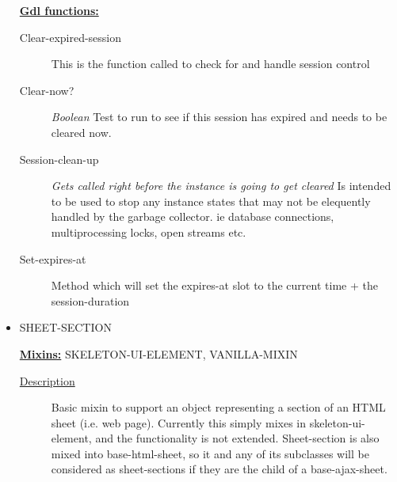 \documentclass [11pt]{book}
\begin{document}
\begin{itemize}
\textbf{
\underline{Gdl functions:}}

\begin{description}

\item [Clear-expired-session]
This is the function called to check for and handle session control


\item [Clear-now?]
\emph{Boolean} Test to run to see if this session has expired and needs to be cleared now.


\item [Session-clean-up]
\emph{Gets called right before the instance is going to get cleared} Is intended to be used to stop any instance states that may not be elequently handled by the garbage collector. ie database connections, multiprocessing locks, open streams etc.


\item [Set-expires-at]
Method which will set the expires-at slot to the current time + the session-duration


\end{description}







\item {}SHEET-SECTION


\textbf{
\underline{Mixins:}} SKELETON-UI-ELEMENT, VANILLA-MIXIN





\begin{description}

\item [
\underline{Description}]


Basic mixin to support an object 
representing a section of an HTML sheet (i.e. web page). Currently 
this simply mixes in skeleton-ui-element, and the functionality is not 
extended. Sheet-section is also mixed into base-html-sheet, so it and 
any of its subclasses will be considered as sheet-sections if they 
are the child of a base-ajax-sheet.





\end{description}





\end{itemize}
\end{document}
